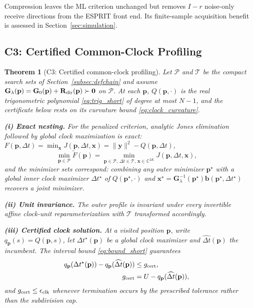 \documentclass[letterpaper,journal]{IEEEtran}
\newtheorem{theorem}{Theorem}
\newcommand{\C}{\mathbb{C}}
\newcommand{\bp}{\mathbf{p}}
\newcommand{\bx}{\mathbf{x}}
\newcommand{\by}{\mathbf{y}}
\newcommand{\bb}{\mathbf{b}}
\newcommand{\bG}{\mathbf{G}}
\newcommand{\bR}{\mathbf{R}}
\begin{document}
Compression leaves the ML criterion unchanged but removes $I-r$ noise-only
receive directions from the ESPRIT front end. Its finite-sample acquisition
benefit is assessed in Section~\ref{sec:simulation}.

\subsection{C3: Certified Common-Clock Profiling}
\begin{theorem}[C3: Certified common-clock profiling]
\label{thm:clock}
Let $\mathcal P$ and $\mathcal T$ be the compact search sets of
Section~\ref{subsec:defchain} and assume
$\bG_\lambda(\bp)=\bG_0(\bp)+\bR_{\rm dir}(\bp)\succ\mathbf0$ on $\mathcal P$.
At each $\bp$, $Q(\bp,\cdot)$ is the real trigonometric polynomial
\eqref{eq:trig_short} of degree at most $N-1$, and the certificate below
rests on its curvature bound \eqref{eq:clock_curvature}.

\textbf{(i) Exact nesting.} For the penalized criterion, analytic Jones
elimination followed by global clock maximization is exact:
$F(\bp,\Delta t)=\min_{\bx}J(\bp,\Delta t,\bx)=\|\by\|^2-Q(\bp,\Delta t)$,
\begin{equation}
 \min_{\bp\in\mathcal P}\widetilde F(\bp)
 =\min_{\bp\in\mathcal P,\,\Delta t\in\mathcal T,\,\bx\in\C^{2K}}
 J(\bp,\Delta t,\bx),
 \label{eq:nestval_short}
\end{equation}
and the minimizer sets correspond: combining any outer minimizer $\bp^\star$
with a global inner clock maximizer $\Delta t^\star$ of $Q(\bp^\star,\cdot)$
and
$\bx^\star=\bG_\lambda^{-1}(\bp^\star)\bb(\bp^\star,\Delta t^\star)$ recovers
a joint minimizer.

\textbf{(ii) Unit invariance.} The outer profile is invariant under every
invertible affine clock-unit reparameterization with $\mathcal T$
transformed accordingly.

\textbf{(iii) Certified clock solution.} At a visited position $\bp$,
write $q_{\bp}(s)=Q(\bp,s)$, let $\Delta t^\star(\bp)$ be a global clock
maximizer and $\widehat{\Delta t}(\bp)$ the incumbent. The interval bound
\eqref{eq:bound_short} guarantees
\begin{align}
 q_{\bp}(\Delta t^\star(\bp))-q_{\bp}(\widehat{\Delta t}(\bp))
 &\le g_{\rm cert},\nonumber\\
 g_{\rm cert}&=U-q_{\bp}(\widehat{\Delta t}(\bp)),
 \label{eq:cert_short}
\end{align}
and $g_{\rm cert}\le\epsilon_{\rm clk}$ whenever termination occurs by the
prescribed tolerance rather than the subdivision cap.
\end{theorem}
\end{document}
